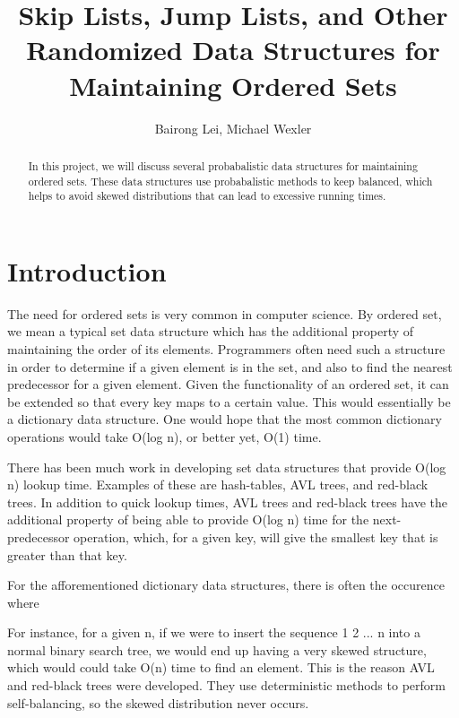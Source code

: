 \documentclass[oribibl]{llncs}
\begin{document}
\title{ Skip Lists, Jump Lists, and Other Randomized Data Structures for Maintaining Ordered Sets}

\author{Bairong Lei, Michael Wexler}


\maketitle

\begin{abstract}
  In this project, we will discuss several probabalistic data structures for maintaining ordered sets. These
  data structures use probabalistic methods to keep balanced, which helps to avoid skewed distributions that
  can lead to excessive running times. 
\end{abstract}


\section{Introduction}

The need for ordered sets is very common in computer science. By ordered set, we mean a typical set data structure which has the additional property of maintaining the order of its elements. Programmers often need
such a structure in order to determine if a given element is in the set, and also to find the nearest predecessor for a given element. Given the functionality of an ordered set, it can be extended so that every 
key maps to a certain value. This would essentially be a dictionary data structure. One would hope that the most common dictionary operations would take O(log n), or better yet, O(1) time.

There has been much work in developing set data structures that provide O(log n) lookup time. Examples of these are hash-tables, AVL trees, and red-black trees. In addition to quick lookup times, AVL trees and red-black trees have the additional property of being able to provide O(log n) time for the next-predecessor operation, which, for a given key, will give the smallest key that is greater than that key.

For the afforementioned dictionary data structures, there is often the occurence where 

For instance, for a given n, if we were to insert the sequence 1 2 ... n into a normal binary search tree, we would end up having a very skewed structure, which would could take O(n) time to find an element. This is the reason AVL and red-black trees were developed. They use deterministic methods to perform self-balancing, so the skewed distribution never occurs.
\end{document}
